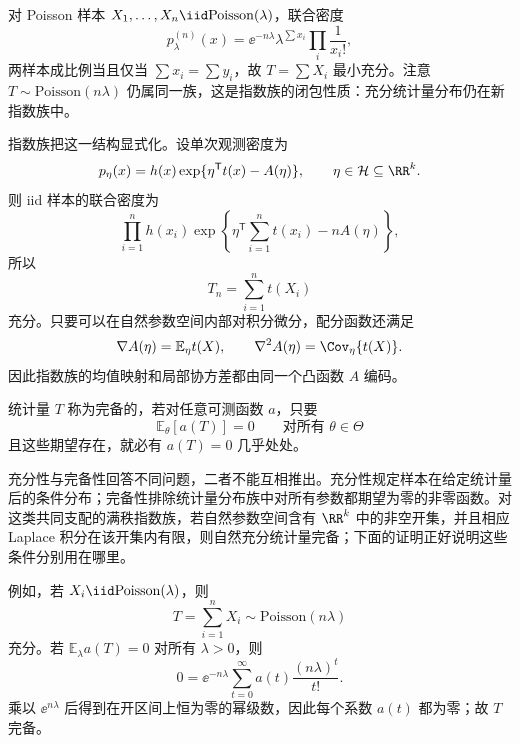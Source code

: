 \begin{workedexample}
对 Poisson 样本 $X_1,\ldots,X_n\iid\mathrm{Poisson}(\lambda)$，联合密度
\[
p_\lambda^{(n)}(x)=\ee^{-n\lambda}\lambda^{\sum x_i}\prod_i\frac1{x_i!},
\]
两样本成比例当且仅当 $\sum x_i=\sum y_i$，故 $T=\sum X_i$ 最小充分。注意 $T\sim\mathrm{Poisson}(n\lambda)$ 仍属同一族，这是指数族的闭包性质：充分统计量分布仍在新指数族中。
\end{workedexample}

\begin{definition}[自然指数族与充分统计量]
指数族把这一结构显式化。设单次观测密度为
\begin{equation}\label{eq:math-stat-exponential-family}
 p_\eta(x)
 =h(x)\exp\{\eta^{\mathsf T}t(x)-A(\eta)\},
 \qquad
 \eta\in\mathcal H\subseteq\RR^k.
\end{equation}
则 iid 样本的联合密度为
\[
 \prod_{i=1}^nh(x_i)
 \exp\!\left\{
 \eta^{\mathsf T}\sum_{i=1}^nt(x_i)-nA(\eta)
 \right\},
\]
所以
\[
 T_n=\sum_{i=1}^nt(X_i)
\]
充分。只要可以在自然参数空间内部对积分微分，配分函数还满足
\begin{equation*}\nabla A(\eta)=\mathbb E_\eta t(X),
 \qquad
 \nabla^2A(\eta)=\Cov_\eta\{t(X)\}.
\end{equation*}
因此指数族的均值映射和局部协方差都由同一个凸函数 $A$ 编码。
\end{definition}

\begin{definition}[完备统计量]
统计量 $T$ 称为完备的，若对任意可测函数 $a$，只要
\[
 \mathbb E_\theta[a(T)]=0
 \qquad\text{对所有 }\theta\in\Theta
\]
且这些期望存在，就必有 $a(T)=0$ 几乎处处。
\end{definition}

充分性与完备性回答不同问题，二者不能互相推出。充分性规定样本在给定统计量后的条件分布；完备性排除统计量分布族中对所有参数都期望为零的非零函数。对这类共同支配的满秩指数族，若自然参数空间含有 $\RR^k$ 中的非空开集，并且相应 Laplace 积分在该开集内有限，则自然充分统计量完备；下面的证明正好说明这些条件分别用在哪里。

\begin{workedexample}
例如，若 $X_i\iid\mathrm{Poisson}(\lambda)$，则
\[
 T=\sum_{i=1}^nX_i\sim\mathrm{Poisson}(n\lambda)
\]
充分。若 $\mathbb E_\lambda a(T)=0$ 对所有 $\lambda>0$，则
\[
 0=\ee^{-n\lambda}
 \sum_{t=0}^\infty a(t)\frac{(n\lambda)^t}{t!}.
\]
乘以 $\ee^{n\lambda}$ 后得到在开区间上恒为零的幂级数，因此每个系数 $a(t)$ 都为零；故 $T$ 完备。
\end{workedexample}


